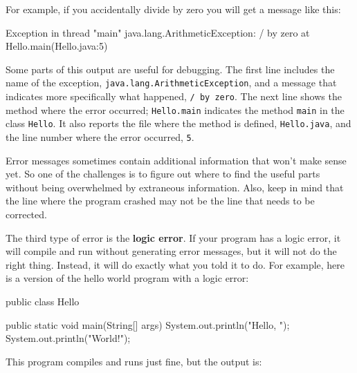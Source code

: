 \documentclass[12pt]{book}
\theoremstyle{exercise}
\newcommand{\java}[1]{\verb"#1"}
\begin{document}
For example, if you accidentally divide by zero you will get a message like this:

\begin{small}
\begin{stdout}
Exception in thread "main" java.lang.ArithmeticException: / by zero
    at Hello.main(Hello.java:5)
\end{stdout}
\end{small}


Some parts of this output are useful for debugging.
The first line includes the name of the exception, \java{java.lang.ArithmeticException}, and a message that indicates more specifically what happened, \java{/ by zero}.
The next line shows the method where the error occurred; \java{Hello.main} indicates the method \java{main} in the class \java{Hello}.
It also reports the file where the method is defined, \java{Hello.java}, and the line number where the error occurred, \java{5}.

Error messages sometimes contain additional information that won't make sense yet.
So one of the challenges is to figure out where to find the useful parts without being overwhelmed by extraneous information.
Also, keep in mind that the line where the program crashed may not be the line that needs to be corrected.



The third type of error is the {\bf logic error}.
If your program has a logic error, it will compile and run without generating error messages, but it will not do the right thing.
Instead, it will do exactly what you told it to do.
For example, here is a version of the hello world program with a logic error:

\begin{code}
public class Hello {

    public static void main(String[] args) {
        System.out.println("Hello, ");
        System.out.println("World!");
    }
}
\end{code}

This program compiles and runs just fine, but the output is:
\end{document}
